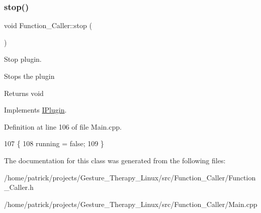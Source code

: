 \subsubsection{\texorpdfstring{stop()}{stop()}}
{\footnotesize\ttfamily void Function\+\_\+\+Caller\+::stop (\begin{DoxyParamCaption}{ }\end{DoxyParamCaption})\hspace{0.3cm}{\ttfamily [virtual]}}



Stop plugin. 

Stops the plugin \begin{DoxyReturn}{Returns}
void 
\end{DoxyReturn}


Implements \hyperlink{class_i_plugin_a86e523c283aec5c9fb21249a76e916ac}{I\+Plugin}.



Definition at line 106 of file Main.\+cpp.


\begin{DoxyCode}
107 \{
108     running = \textcolor{keyword}{false};
109 \}
\end{DoxyCode}


The documentation for this class was generated from the following files\+:\begin{DoxyCompactItemize}
\item 
/home/patrick/projects/\+Gesture\+\_\+\+Therapy\+\_\+\+Linux/src/\+Function\+\_\+\+Caller/Function\+\_\+\+Caller.\+h\item 
/home/patrick/projects/\+Gesture\+\_\+\+Therapy\+\_\+\+Linux/src/\+Function\+\_\+\+Caller/Main.\+cpp\end{DoxyCompactItemize}
